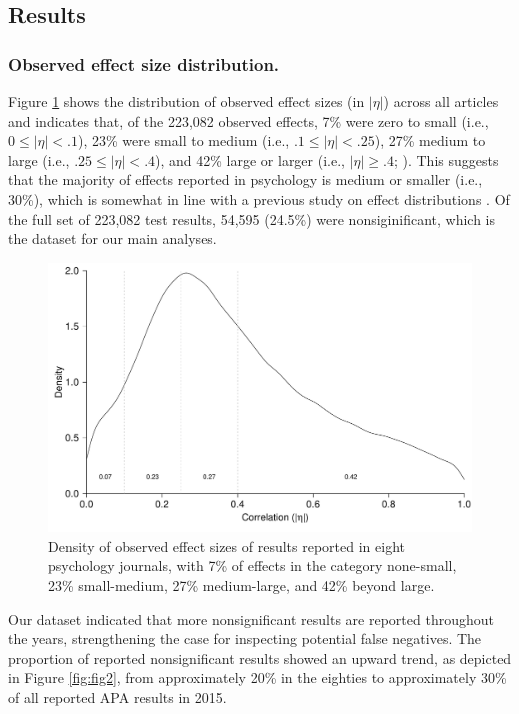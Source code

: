 \documentclass{article}
\begin{document}
\subsection*{Results}

\subsubsection*{Observed effect size distribution.}


Figure \ref{fig:fig1} shows the distribution of observed effect sizes (in $|\eta|$) across all articles and indicates that, of the 223,082 observed effects, 7\% were zero to small (i.e., $0\leq|\eta|<.1$), 23\% were small to medium (i.e., $.1\leq|\eta|<.25$), 27\% medium to large (i.e., $.25\leq|\eta|<.4$), and 42\% large or larger (i.e., $|\eta|\geq.4$; \cite{Cohen1988-wg}). This suggests that the majority of effects reported in psychology is medium or smaller (i.e., 30\%), which is somewhat in line with a previous study on effect distributions \cite{Gignac2016-je}. Of the full set of 223,082 test results, 54,595 (24.5\%) were nonsiginificant, which is the dataset for our main analyses. 

\begin{figure}
\begin{center}
\includegraphics{../figures/Fig1.pdf}
\end{center}
\caption{Density of observed effect sizes of results reported in eight psychology journals, with 7\% of effects in the category none-small, 23\% small-medium, 27\% medium-large, and 42\% beyond large.}
\label{fig:fig1}
\end{figure}

Our dataset indicated that more nonsignificant results are reported throughout the years, strengthening the case for inspecting potential false negatives. The proportion of reported nonsignificant results showed an upward trend, as depicted in Figure \ref{fig:fig2}, from approximately 20\% in the eighties to approximately 30\% of all reported APA results in 2015.
\end{document}
